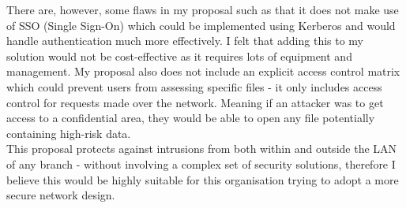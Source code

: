 \documentclass[11pt]{article}
\begin{document}
      There are, however, some flaws in my proposal such as that it does not make use of SSO (Single Sign-On) which could be implemented using Kerberos and would handle authentication much more effectively. I felt that adding this to my solution would not be cost-effective as it requires lots of equipment and management. My proposal also does not include an explicit access control matrix which could prevent users from assessing specific files - it only includes access control for requests made over the network. Meaning if an attacker was to get access to a confidential area, they would be able to open any file potentially containing high-risk data.\\

      This proposal protects against intrusions from both within and outside the LAN of any branch - without involving a complex set of security solutions, therefore I believe this would be highly suitable for this organisation trying to adopt a more secure network design.

  \newpage

  
  
\end{document}
